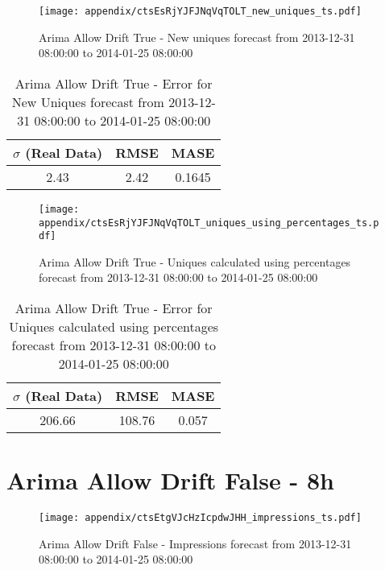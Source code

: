 \begin{figure}[H] \begin{center} \leavevmode
\texttt{[image: appendix/ctsEsRjYJFJNqVqTOLT\_new\_uniques\_ts.pdf]} \caption[]{
Arima Allow Drift True - New uniques forecast from 2013-12-31 08:00:00 to 2014-01-25 08:00:00} \label{fig:appendix/ctsEsRjYJFJNqVqTOLT_new_uniques_ts.pdf} \end{center}
\end{figure}

\begin{table}[H]
\centering
\footnotesize
\begin{tabular}{ccc}
$\sigma$ (Real Data) & RMSE & MASE   \\ \hline
2.43 & 2.42 & 0.1645 \\
\end{tabular}

\vspace{0.5cm}

\caption[]{
Arima Allow Drift True - Error for New Uniques forecast from 2013-12-31 08:00:00 to 2014-01-25 08:00:00}
\end{table}

\begin{figure}[H] \begin{center} \leavevmode
\texttt{[image: appendix/ctsEsRjYJFJNqVqTOLT\_uniques\_using\_percentages\_ts.pdf]} \caption[]{
Arima Allow Drift True - Uniques calculated using percentages forecast from 2013-12-31 08:00:00 to 2014-01-25 08:00:00} \label{fig:appendix/ctsEsRjYJFJNqVqTOLT_uniques_using_percentages_ts.pdf} \end{center}
\end{figure}

\begin{table}[H]
\centering
\footnotesize
\begin{tabular}{ccc}
$\sigma$ (Real Data) & RMSE & MASE   \\ \hline
206.66 & 108.76 & 0.057 \\
\end{tabular}

\vspace{0.5cm}

\caption[]{
Arima Allow Drift True - Error for Uniques calculated using percentages forecast from 2013-12-31 08:00:00 to 2014-01-25 08:00:00}
\end{table}

\section{Arima Allow Drift False - 8h}
\begin{figure}[H] \begin{center} \leavevmode
\texttt{[image: appendix/ctsEtgVJcHzIcpdwJHH\_impressions\_ts.pdf]} \caption[]{
Arima Allow Drift False - Impressions forecast from 2013-12-31 08:00:00 to 2014-01-25 08:00:00} \label{fig:appendix/ctsEtgVJcHzIcpdwJHH_impressions_ts.pdf} \end{center}
\end{figure}

